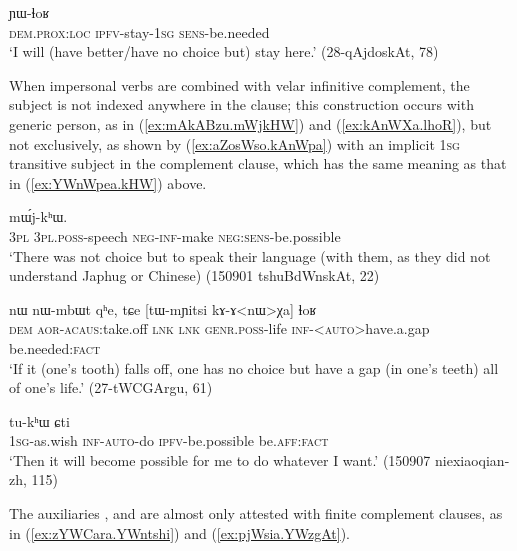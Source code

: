 \begin{exe} 
\ex \label{ex:kurAZia.YWlhoR}
 ɲɯ-ɬoʁ \\
\textsc{dem}.\textsc{prox}:\textsc{loc} \textsc{ipfv}-stay-\textsc{1sg} \textsc{sens}-be.needed \\
\glt `I will (have better/have no choice but) stay here.' (28-qAjdoskAt, 78)
\end{exe} 

When impersonal verbs are combined with velar infinitive complement, the subject is not indexed anywhere in the clause; this construction occurs with generic person, as in (\ref{ex:mAkABzu.mWjkHW}) and (\ref{ex:kAnWXa.lhoR}), but not exclusively, as shown by (\ref{ex:aZosWso.kAnWpa}) with an implicit \textsc{1sg} transitive subject in the complement clause, which has the same meaning as that in (\ref{ex:YWnWpea.kHW}) above.

\begin{exe} 
\ex \label{ex:mAkABzu.mWjkHW}
 mɯ́j-kʰɯ. \\
\textsc{3pl} \textsc{3pl}.\textsc{poss}-speech \textsc{neg}-\textsc{inf}-make \textsc{neg}:\textsc{sens}-be.possible \\
\glt `There was not choice but to speak their language (with them, as they did not understand Japhug or Chinese) (150901 tshuBdWnskAt, 22)
\end{exe} 

\begin{exe} 
\ex \label{ex:kAnWXa.lhoR}
\gll  nɯ nɯ-mbɯt qʰe, tɕe [tɯ-mɲitsi kɤ-ɤ<nɯ>χa] ɬoʁ \\
\textsc{dem} \textsc{aor}-\textsc{acaus}:take.off \textsc{lnk} \textsc{lnk} \textsc{genr}.\textsc{poss}-life \textsc{inf}-<\textsc{auto}>have.a.gap be.needed:\textsc{fact} \\
\glt `If it (one's tooth) falls off, one has no choice but have a gap (in one's teeth) all of one's life.' (27-tWCGArgu, 61)
\end{exe} 

\begin{exe} 
\ex \label{ex:aZosWso.kAnWpa}
 tu-kʰɯ ɕti \\
\textsc{1sg}-as.wish \textsc{inf}-\textsc{auto}-do \textsc{ipfv}-be.possible be.\textsc{aff}:\textsc{fact} \\
\glt `Then it will become possible for me to do whatever I want.' (150907 niexiaoqian-zh, 115)
\end{exe} 


The auxiliaries ,  and  are almost only attested with finite complement clauses, as in (\ref{ex:zYWCara.YWntshi}) and (\ref{ex:pjWsia.YWzgAt}).

